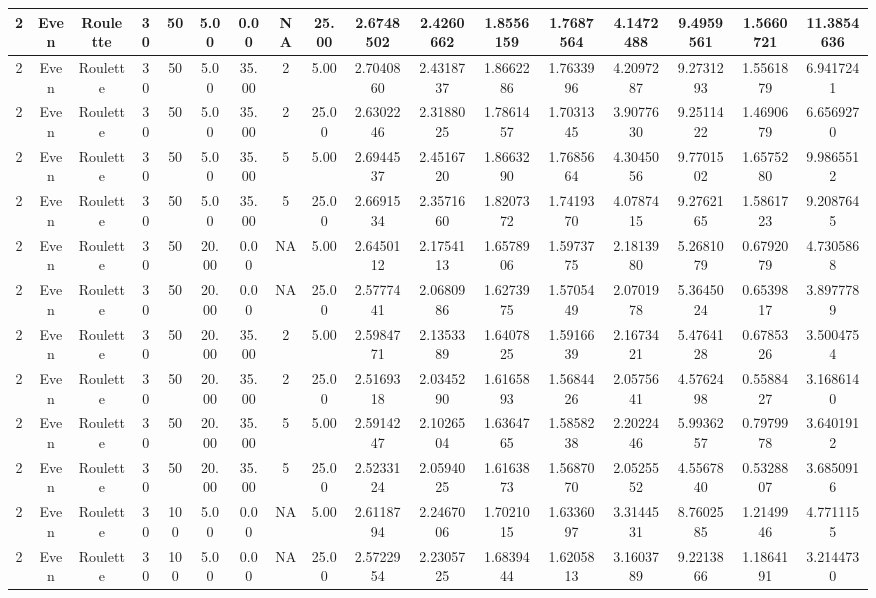 \documentclass[a4paper]{article}
\begin{document}
\begin{center}
\begin{tabular}{ | c | c | c | c | c | c | c | c | c | c | c | c | c | c | c | c | c | }
		\hline
		2	&	Even	&	Roulette	&	30	&	50	&	5.00	&	0.00	&	NA	&	25.00	&	2.6748502	&	2.4260662	&	1.8556159	&	1.7687564	&	4.1472488	&	9.4959561	&	1.5660721	&	11.3854636 \\
		\hline
		2	&	Even	&	Roulette	&	30	&	50	&	5.00	&	35.00	&	2	&	5.00	&	2.7040860	&	2.4318737	&	1.8662286	&	1.7633996	&	4.2097287	&	9.2731293	&	1.5561879	&	6.9417241 \\
		\hline
		2	&	Even	&	Roulette	&	30	&	50	&	5.00	&	35.00	&	2	&	25.00	&	2.6302246	&	2.3188025	&	1.7861457	&	1.7031345	&	3.9077630	&	9.2511422	&	1.4690679	&	6.6569270 \\
		\hline
		2	&	Even	&	Roulette	&	30	&	50	&	5.00	&	35.00	&	5	&	5.00	&	2.6944537	&	2.4516720	&	1.8663290	&	1.7685664	&	4.3045056	&	9.7701502	&	1.6575280	&	9.9865512 \\
		\hline
		2	&	Even	&	Roulette	&	30	&	50	&	5.00	&	35.00	&	5	&	25.00	&	2.6691534	&	2.3571660	&	1.8207372	&	1.7419370	&	4.0787415	&	9.2762165	&	1.5861723	&	9.2087645 \\
		\hline
		2	&	Even	&	Roulette	&	30	&	50	&	20.00	&	0.00	&	NA	&	5.00	&	2.6450112	&	2.1754113	&	1.6578906	&	1.5973775	&	2.1813980	&	5.2681079	&	0.6792079	&	4.7305868 \\
		\hline
		2	&	Even	&	Roulette	&	30	&	50	&	20.00	&	0.00	&	NA	&	25.00	&	2.5777441	&	2.0680986	&	1.6273975	&	1.5705449	&	2.0701978	&	5.3645024	&	0.6539817	&	3.8977789 \\
		\hline
		2	&	Even	&	Roulette	&	30	&	50	&	20.00	&	35.00	&	2	&	5.00	&	2.5984771	&	2.1353389	&	1.6407825	&	1.5916639	&	2.1673421	&	5.4764128	&	0.6785326	&	3.5004754 \\
		\hline
		2	&	Even	&	Roulette	&	30	&	50	&	20.00	&	35.00	&	2	&	25.00	&	2.5169318	&	2.0345290	&	1.6165893	&	1.5684426	&	2.0575641	&	4.5762498	&	0.5588427	&	3.1686140 \\
		\hline
		2	&	Even	&	Roulette	&	30	&	50	&	20.00	&	35.00	&	5	&	5.00	&	2.5914247	&	2.1026504	&	1.6364765	&	1.5858238	&	2.2022446	&	5.9936257	&	0.7979978	&	3.6401912 \\
		\hline
		2	&	Even	&	Roulette	&	30	&	50	&	20.00	&	35.00	&	5	&	25.00	&	2.5233124	&	2.0594025	&	1.6163873	&	1.5687070	&	2.0525552	&	4.5567840	&	0.5328807	&	3.6850916 \\
		\hline
		2	&	Even	&	Roulette	&	30	&	100	&	5.00	&	0.00	&	NA	&	5.00	&	2.6118794	&	2.2467006	&	1.7021015	&	1.6336097	&	3.3144531	&	8.7602585	&	1.2149946	&	4.7711155 \\
		\hline
		2	&	Even	&	Roulette	&	30	&	100	&	5.00	&	0.00	&	NA	&	25.00	&	2.5722954	&	2.2305725	&	1.6839444	&	1.6205813	&	3.1603789	&	9.2213866	&	1.1864191	&	3.2144730 \\

\end{tabular}
\end{center}
\end{document}
